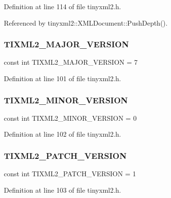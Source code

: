 Definition at line 114 of file tinyxml2.\+h.



Referenced by tinyxml2\+::\+X\+M\+L\+Document\+::\+Push\+Depth().

\mbox{\label{tinyxml2_8h_a53acdb84a871ed12b99d5f4aff209bf4}} 
\subsubsection{TIXML2\_MAJOR\_VERSION}
{\footnotesize\ttfamily const int T\+I\+X\+M\+L2\+\_\+\+M\+A\+J\+O\+R\+\_\+\+V\+E\+R\+S\+I\+ON = 7\hspace{0.3cm}{\ttfamily [static]}}



Definition at line 101 of file tinyxml2.\+h.

\mbox{\label{tinyxml2_8h_ac94d4b856d14f3c3a8c1dcdbd6ee13b4}} 
\subsubsection{TIXML2\_MINOR\_VERSION}
{\footnotesize\ttfamily const int T\+I\+X\+M\+L2\+\_\+\+M\+I\+N\+O\+R\+\_\+\+V\+E\+R\+S\+I\+ON = 0\hspace{0.3cm}{\ttfamily [static]}}



Definition at line 102 of file tinyxml2.\+h.

\mbox{\label{tinyxml2_8h_a1406cb43e9d84251509e069b6cb21781}} 
\subsubsection{TIXML2\_PATCH\_VERSION}
{\footnotesize\ttfamily const int T\+I\+X\+M\+L2\+\_\+\+P\+A\+T\+C\+H\+\_\+\+V\+E\+R\+S\+I\+ON = 1\hspace{0.3cm}{\ttfamily [static]}}



Definition at line 103 of file tinyxml2.\+h.

